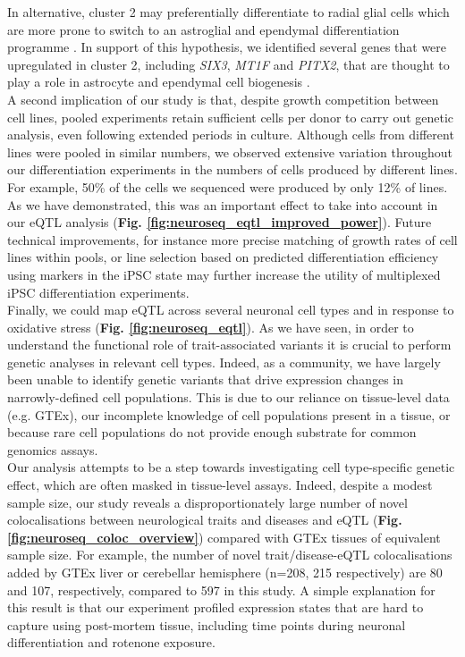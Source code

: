 In alternative, cluster 2 may preferentially differentiate to radial glial cells which are more prone to switch to an astroglial and ependymal differentiation programme \cite{spassky2005adult}. 
In support of this hypothesis, we identified several genes that were upregulated in cluster 2, including \textit{SIX3}, \textit{MT1F} and \textit{PITX2}, that are thought to play a role in astrocyte and ependymal cell biogenesis \cite{lavado2011six3, michael2011up, jacquet2009foxj1}. \\

A second implication of our study is that, despite growth competition between cell lines, pooled experiments retain sufficient cells per donor to carry out genetic analysis, even following extended periods in culture. 
Although cells from different lines were pooled in similar numbers, we observed extensive variation throughout our differentiation experiments in the numbers of cells produced by different lines. 
For example, 50\% of the cells we sequenced were produced by only 12\% of lines.
As we have demonstrated, this was an important effect to take into account in our eQTL analysis (\textbf{Fig. \ref{fig:neuroseq_eqtl_improved_power}}).
Future technical improvements, for instance more precise matching of growth rates of cell lines within pools, or line selection based on predicted differentiation efficiency using markers in the iPSC state may further increase the utility of multiplexed iPSC differentiation experiments.\\

Finally, we could map eQTL across several neuronal cell types and in response to oxidative stress (\textbf{Fig. \ref{fig:neuroseq_eqtl}}).
As we have seen, in order to understand the functional role of trait-associated variants it is crucial to perform genetic analyses in relevant cell types.
Indeed, as a community, we have largely been unable to identify genetic variants that drive expression changes in narrowly-defined cell populations.
This is due to our reliance on tissue-level data (e.g. GTEx), our incomplete knowledge of cell populations present in a tissue, or because rare cell populations do not provide enough substrate for common genomics assays. \\

Our analysis attempts to be a step towards investigating cell type-specific genetic effect, which are often masked in tissue-level assays.
Indeed, despite a modest sample size, our study reveals a disproportionately large number of novel colocalisations between neurological traits and diseases and eQTL (\textbf{Fig. \ref{fig:neuroseq_coloc_overview}}) compared with GTEx tissues of equivalent sample size. 
For example, the number of novel trait/disease-eQTL colocalisations added by GTEx liver or cerebellar hemisphere (n=208, 215 respectively) are 80 and 107, respectively, compared to 597 in this study. 
A simple explanation for this result is that our experiment profiled expression states that are hard to capture using post-mortem tissue, including time points during neuronal differentiation and rotenone exposure. \\

